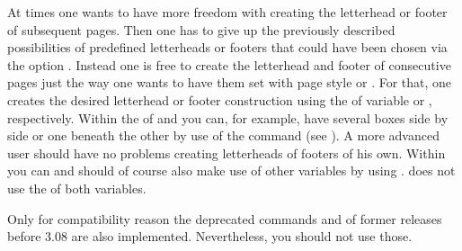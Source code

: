 \begin{Declaration}
\end{Declaration}
At times one wants to have more freedom with creating the letterhead or footer
of subsequent pages. Then one has to give up the previously described
possibilities of predefined letterheads or footers that could have been chosen
via the option . Instead one is
free to create the letterhead and footer of consecutive pages just the way one
wants to have them set with page style
 or
.  For that, one creates the
desired letterhead or footer construction using the  of
variable  or
, respectively. Within the  of
 and  you can, for example, have several
boxes side by side or one beneath the other by use of the 
command (see \cite{latex:usrguide}). A more advanced user should have no
problems creating letterheads of footers of his own.  Within 
you can and should of course also make use of other variables by using
. \KOMAScript{} does not use the  of both
variables.

Only for compatibility reason the deprecated commands  and
 of former 
releases before 3.08 are also implemented. Nevertheless, you should not use
those.%
%
\EndIndexGroup
%
\EndIndexGroup
%
\EndIndexGroup






